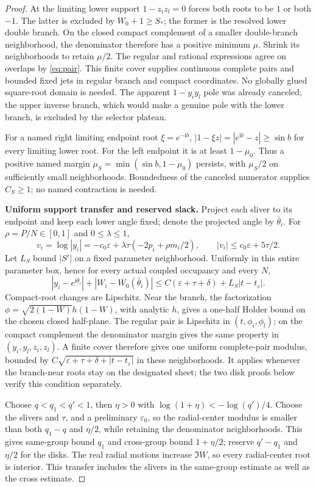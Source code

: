 \documentclass[11pt]{article}
\numberwithin{equation}{section}
\theoremstyle{definition}
\newcommand{\ii}{\mathrm i}
\newcommand{\eps}{\varepsilon}
\begin{document}
\begin{proof}
At the limiting lower support \(1-z_i z_l=0\) forces both
roots to be \(1\) or both \(-1\). The latter is excluded by
\(W_0+1\ge S_*\); the former is the resolved lower double branch.
On the closed compact complement of a smaller double-branch
neighborhood, the denominator therefore has a positive minimum
\(\mu\). Shrink its neighborhoods to retain \(\mu/2\).
The regular and rational expressions agree on overlaps by
\eqref{eq:pair}. This finite cover supplies continuous complete
pairs and bounded fixed jets in regular branch and compact
coordinates. No globally glued square-root domain is needed.
The apparent \(1-y_i y_l\) pole was already canceled; the upper
inverse branch, which would make a genuine pole with the lower
branch, is excluded by the selector plateau.

For a named right limiting endpoint root \(\xi=e^{-\ii b}\),
\(|1-\xi z|=|e^{\ii b}-z|\ge\sin b\) for every limiting lower
root. For the left endpoint it is at least \(1-\mu_0\).
Thus a positive named margin
\(\mu_S=\min(\sin b,1-\mu_0)\) persists, with \(\mu_S/2\)
on sufficiently small neighborhoods. Boundedness of the canceled
numerator supplies \(C_S\ge1\); no named contraction is needed.

\par\smallskip\noindent\textbf{Uniform support transfer and reserved slack.}
Project each sliver to its endpoint and keep each lower angle
fixed; denote the projected angle by \(\bar\theta_i\).
For \(\rho=P/N\in[0,1]\) and \(0\le\lambda\le1\),
\[
 v_i=\log|y_i|=-c_0\eps+\lambda\tau(-2p_i+\rho m_i/2),
 \qquad |v_i|\le c_0\eps+5\tau/2.
\]
Let \(L_S\) bound \(|S'|\) on a fixed parameter neighborhood.
Uniformly in this entire parameter box, hence for every actual
coupled occupancy and every \(N\),
\[
 |y_i-e^{\ii\bar\theta_i}|+|W_i-W_0(\bar\theta_i)|
 \le C(\eps+\tau+\delta)+L_S|t-t_\eps|.
\]
Compact-root changes are Lipschitz. Near the branch, the factorization
\(\phi=\sqrt{2(1-W)}h(1-W)\), with analytic \(h\), gives a
one-half Holder bound on the chosen closed half-plane.
The regular pair is Lipschitz in \((t,\phi_i,\phi_l)\);
on the compact complement the denominator margin gives the same
property in \((y_i,y_l,z_i,z_l)\). A finite cover therefore gives
one uniform complete-pair modulus, bounded by
\(C\sqrt{\eps+\tau+\delta+|t-t_\eps|}\) in these neighborhoods.
It applies whenever the branch-near roots stay on the designated
sheet; the two disk proofs below verify this condition separately.

Choose \(q<q_1<q'<1\), then \(\eta>0\) with
\(\log(1+\eta)<-\log(q')/4\).
Choose the slivers and \(\tau\), and a preliminary \(\eps_0\),
so the radial-center modulus is smaller than both \(q_1-q\)
and \(\eta/2\), while retaining the denominator neighborhoods.
This gives same-group bound \(q_1\) and cross-group bound
\(1+\eta/2\); reserve \(q'-q_1\) and \(\eta/2\) for the disks.
The real radial motions increase \(\Im W\), so every radial-center
root is interior. This transfer includes the slivers in the
same-group estimate as well as the cross estimate.


\end{proof}
\end{document}
